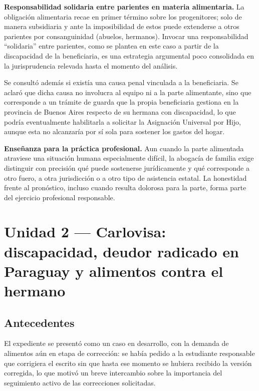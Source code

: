 \documentclass[12pt,oneside]{book}
\begin{document}
\begin{important}
\textbf{Responsabilidad solidaria entre parientes en materia alimentaria.} La obligación alimentaria recae en primer término sobre los progenitores; solo de manera subsidiaria y ante la imposibilidad de estos puede extenderse a otros parientes por consanguinidad (abuelos, hermanos). Invocar una responsabilidad ``solidaria'' entre parientes, como se plantea en este caso a partir de la discapacidad de la beneficiaria, es una estrategia argumental poco consolidada en la jurisprudencia relevada hasta el momento del análisis.
\end{important}

Se consultó además si existía una causa penal vinculada a la beneficiaria. Se aclaró que dicha causa no involucra al equipo ni a la parte alimentante, sino que corresponde a un trámite de guarda que la propia beneficiaria gestiona en la provincia de Buenos Aires respecto de su hermana con discapacidad, lo que podría eventualmente habilitarla a solicitar la Asignación Universal por Hijo, aunque esta no alcanzaría por sí sola para sostener los gastos del hogar.

\begin{note}
\textbf{Enseñanza para la práctica profesional.} Aun cuando la parte alimentada atraviese una situación humana especialmente difícil, la abogacía de familia exige distinguir con precisión qué puede sostenerse jurídicamente y qué corresponde a otro fuero, a otra jurisdicción o a otro tipo de asistencia estatal. La honestidad frente al pronóstico, incluso cuando resulta dolorosa para la parte, forma parte del ejercicio profesional responsable.
\end{note}

\section{Unidad 2 --- Carlovisa: discapacidad, deudor radicado en Paraguay y alimentos contra el hermano}

\subsection{Antecedentes}

El expediente se presentó como un caso en desarrollo, con la demanda de alimentos aún en etapa de corrección: se había pedido a la estudiante responsable que corrigiera el escrito sin que hasta ese momento se hubiera recibido la versión corregida, lo que motivó un breve intercambio sobre la importancia del seguimiento activo de las correcciones solicitadas.
\end{document}
